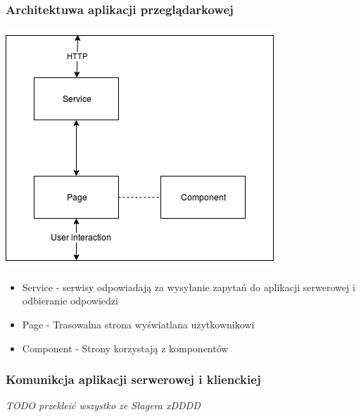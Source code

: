 \documentclass[polish,12pt]{aghthesis}
\begin{document}
\subsubsection{Architektuwa aplikacji przeglądarkowej}
\includegraphics[width=\textwidth]{front-schema}
\begin{itemize}
    \item Service - serwisy odpowiadają za wysyłanie zapytań do aplikacji serwerowej i odbieranie odpowiedzi
    \item Page - Trasowalna strona wyświatlana użytkownikowi
    \item Component - Strony korzystają z komponentów
\end{itemize}

\subsubsection{Komunikcja aplikacji serwerowej i klienckiej}
\emph{TODO przekleić wszystko ze Słagera xDDDD}
\end{document}
